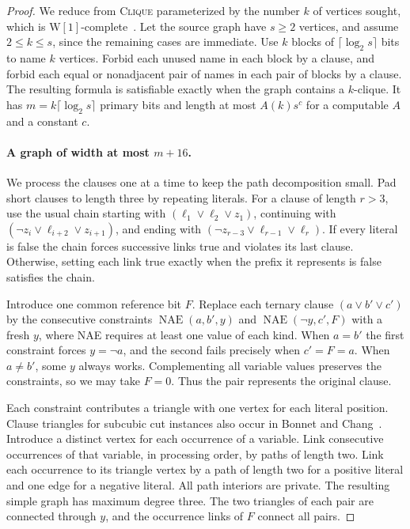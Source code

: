 \documentclass[11pt]{article}
\begin{document}
\begin{proof}
We reduce from \textsc{Clique} parameterized by the number \(k\) of
vertices sought, which is \(\mathrm{W}[1]\)-complete~\cite{df}.
Let the source graph have \(s\ge2\) vertices, and assume \(2\le k\le s\),
since the remaining cases are immediate. Use \(k\) blocks of
\(\lceil\log_2 s\rceil\) bits to name \(k\) vertices. Forbid each unused
name in each block by a clause, and forbid each equal or nonadjacent
pair of names in each pair of blocks by a clause. The resulting formula
is satisfiable exactly when the graph contains a \(k\)-clique.
It has \(m=k\lceil\log_2 s\rceil\) primary bits and length at most
\(A(k)s^c\) for a computable \(A\) and a constant \(c\).

\paragraph{A graph of width at most \(m+16\).}
We process the clauses one at a time to keep the path decomposition
small. Pad short clauses to length three by repeating literals. For
a clause of length \(r>3\), use the usual chain starting with
\((\ell_1\lor\ell_2\lor z_1)\), continuing with
\((\neg z_i\lor\ell_{i+2}\lor z_{i+1})\), and ending with
\((\neg z_{r-3}\lor\ell_{r-1}\lor\ell_r)\).
If every literal is false the chain forces successive links true and
violates its last clause. Otherwise, setting each link true exactly
when the prefix it represents is false satisfies the chain.

Introduce one common reference bit \(F\). Replace each ternary clause
\((a\lor b'\lor c')\) by the consecutive constraints
\(\operatorname{NAE}(a,b',y)\) and
\(\operatorname{NAE}(\neg y,c',F)\) with a fresh \(y\), where NAE
requires at least one value of each kind. When \(a=b'\) the first
constraint forces \(y=\neg a\), and the second fails precisely when
\(c'=F=a\). When \(a\ne b'\), some \(y\) always works. Complementing
all variable values preserves the constraints, so we may take \(F=0\).
Thus the pair represents the original clause.

Each constraint contributes a triangle with one vertex for each
literal position. Clause triangles for subcubic cut instances also
occur in Bonnet and Chang~\cite[Lemma~3.3]{bc}. Introduce a distinct
vertex for each occurrence of a variable. Link consecutive occurrences
of that variable, in processing order, by paths of length two. Link each
occurrence to its triangle vertex by a path of length two for a positive
literal and one edge for a negative literal. All path interiors are
private. The resulting simple graph has maximum degree three. The two
triangles of each pair are connected through \(y\), and the occurrence
links of \(F\) connect all pairs.


\end{proof}
\end{document}
